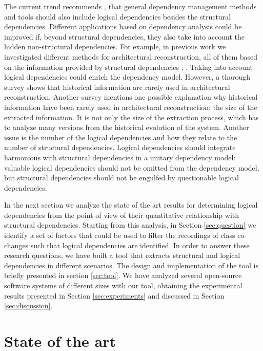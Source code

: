 \documentclass[conference]{IEEEtran}
\begin{document}
The current trend recommends \cite{Oliva:2011:ISL:2067853.2068086}, \cite{DBLP:journals/jss/AjienkaC17} that general dependency management methods and tools should also include logical dependencies besides the structural dependencies. Different applications based on dependency analysis could be improved if, beyond structural dependencies, they also take into account the hidden non-structural dependencies. For example, in previous work   we investigated different methods for architectural reconstruction,  all of them based on the information provided by structural dependencies \cite{SoraConti}, \cite{PagerankENASE}. Taking into account logical dependencies could enrich the dependency model. However, a thorough survey \cite{sar} shows that historical information are rarely used in architectural reconstruction. Another survey \cite{Shtern:2012:CMS:2332427.2332428} mentions one possible explanation why historical information have been rarely used in architectural reconstruction: the size of the extracted information. It is not only the size of the extraction process, which has to analyze many versions from the historical evolution of the system. Another issue is the number of the logical dependencies and how they relate to the number of structural dependencies. Logical dependencies should integrate harmonious with structural dependencies in a unitary dependency model: valuable logical dependencies should not be omitted from the dependency model, but structural dependencies should not be engulfed by questionable logical dependencies.  

In the next section we analyze the state of the art results for determining logical dependencies from the point of view of their quantitative relationship with structural dependencies. Starting from this analysis, in Section \ref{sec:question} we identify a set of factors that could be used to filter the recordings of class co-changes such that logical dependencies are identified. In order to answer these research questions, we have built a tool that extracts structural and logical dependencies in different scenarios. The design and implementation of the tool is briefly presented in section \ref{sec:tool}. We have analyzed several open-source software systems of different sizes with our tool, obtaining the experimental results presented in Section \ref{sec:experiments} and discussed in Section \ref{sec:discussion}.
 


\section{State of the art}
\label{sec:state}
\end{document}
